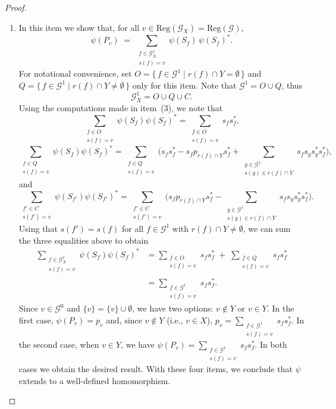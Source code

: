 \documentclass[10pt,a4paper]{amsart}
\begin{document}
\begin{proof}
\begin{enumerate}
\item In this item we show that, for all $v \in \mathrm{Reg}(\mathcal{G}_X)=\mathrm{Reg}(\mathcal{G})$,
\[
\psi(P_v) \;=\; \sum_{\substack{f \in \mathcal{G}_X^1 \\ s(f) = v}} \psi(S_f)\, \psi(S_f)^*.
\]
For notational convenience, set $O = \{\,f \in \mathcal{G}^1 \mid r(f) \cap Y = \emptyset\,\}$ and
$Q = \{\,f \in \mathcal{G}^1 \mid r(f) \cap Y \neq \emptyset\,\}$ only for this item. Note that
$\mathcal{G}^1 = O \cup Q$, thus
\[
\mathcal{G}_X^1 = O \cup Q \cup C.
\]
Using the computations made in item~(3), we note that
\[
\sum_{\substack{f \in O \\ s(f) = v}} \psi(S_f) \psi(S_f)^*
=
\sum_{\substack{f \in O \\ s(f) = v}} s_f s_f^*,
\]
\[
\sum_{\substack{f \in Q \\ s(f) = v}} \psi(S_f) \psi(S_f)^*
=
\sum_{\substack{f \in Q \\ s(f) = v}}
\Big(
s_f s_f^*
-
s_f p_{r(f) \cap Y} s_f^*
+
\sum_{\substack{g \in \mathcal{G}^1 \\ s(g) \in r(f) \cap Y}}
s_f s_g s_g^* s_f^*
\Big),
\]
and
\[
\sum_{\substack{f' \in C \\ s(f') = v}} \psi(S_{f'}) \psi(S_{f'})^*
=
\sum_{\substack{f' \in C \\ s(f') = v}}
\Big(
s_f p_{r(f) \cap Y} s_f^*
-
\sum_{\substack{g \in \mathcal{G}^1 \\ s(g) \in r(f) \cap Y}}
s_f s_g s_g^* s_f^*
\Big).
\]
Using that $s(f') = s(f)$ for all $f \in \mathcal{G}^1$ with $r(f) \cap Y \neq \emptyset$, we can sum
the three equalities above to obtain
\begin{align*}
\sum_{\substack{f \in \mathcal{G}_X^1 \\ s(f) = v}} \psi(S_f) \psi(S_f)^*
&=
\sum_{\substack{f \in O \\ s(f) = v}} s_f s_f^*
\;+\;
\sum_{\substack{f \in Q \\ s(f) = v}} s_f s_f^* \\
&=
\sum_{\substack{f \in \mathcal{G}^1 \\ s(f) = v}} s_f s_f^*.
\end{align*}
Since $v \in \mathcal{G}^0$ and $\{v\} = \{v\} \cup \emptyset$, we have two options: $v \notin Y$ or
$v \in Y$. In the first case, $\psi(P_v) = p_v$ and, since $v \notin Y$ (i.e., $v \in X$),
$p_v = \sum_{\substack{f \in \mathcal{G}^1 \\ s(f) = v}} s_f s_f^*$. In the second case, when
$v \in Y$, we have $\psi(P_v) = \sum_{\substack{f \in \mathcal{G}^1 \\ s(f) = v}} s_f s_f^*$.
In both cases we obtain the desired result. With these four items, we conclude that $\psi$ extends
to a well-defined homomorphism.


\end{enumerate}
\end{proof}
\end{document}

